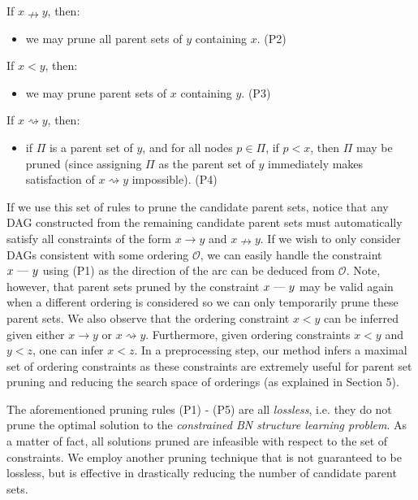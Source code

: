 \documentclass[twoside,11pt]{article}
\begin{document}
If $x \nrightarrow y$, then:
	\begin{itemize}
	\item we may prune all parent sets of $y$ containing $x$. (P2)
	\end{itemize}

If $x < y$, then:
	\begin{itemize}
	\item we may prune parent sets of $x$ containing $y$. (P3)
	\end{itemize}
	
If $x \rightsquigarrow y$, then:
	\begin{itemize}
	\item if $\Pi$ is a parent set of $y$, and for all nodes $p \in \Pi$, if $p < x$, then $\Pi$ may be pruned (since assigning $\Pi$ as the parent set of $y$ immediately makes
		satisfaction of $x \rightsquigarrow y$ impossible). (P4)
	\end{itemize}
	
\bigskip

If we use this set of rules to prune the candidate parent sets, notice that any DAG constructed from the remaining candidate parent sets must automatically satisfy 
all constraints of the form $x \rightarrow y$ and $x \nrightarrow y$. If we wish to only consider DAGs consistent with some ordering $\mathcal{O}$, 
we can easily handle the constraint $x \text{ \textemdash \  } y$ using (P1) as the direction of the arc can be deduced from $\mathcal{O}$. Note, however, that 
parent sets pruned by the constraint $x \text{ \textemdash \  } y$ may be valid again when a different ordering is considered so we can only temporarily prune these parent sets.
We also observe that the ordering constraint $x < y$ can be inferred given either $x \rightarrow y$ or $x \rightsquigarrow y$. Furthermore, given ordering constraints $x < y$ and $y < z$, one can infer $x < z$. In a preprocessing step, our method infers a maximal set of ordering constraints as these constraints are extremely useful for parent set pruning and reducing the search space of orderings (as explained in Section 5). 


\medskip

The aforementioned pruning rules (P1) - (P5) are all \emph{lossless}, i.e. they do not prune the optimal solution to the \emph{constrained BN structure learning problem}. 
As a matter of fact, all solutions pruned are infeasible with respect to the set of constraints. We employ another pruning technique that is not guaranteed to be lossless, but is 
effective in drastically reducing the number of candidate parent sets.
\end{document}
